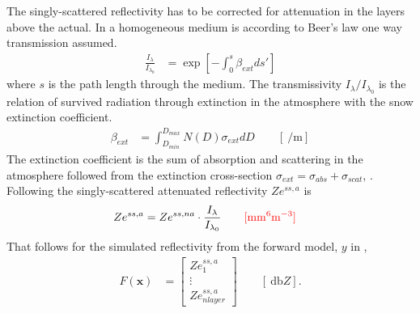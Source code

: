 The singly-scattered reflectivity has to be corrected for attenuation in the layers above the actual. In a homogeneous medium is according to Beer's law one way transmission assumed. 
\begin{align}
	\frac{I_{\lambda}}{I_{\lambda_0}} & = \exp \left[ - \int_0^s \beta_{ext} ds'\right] \label{eq:Beer}
\end{align}
where $s$ is the path length through the medium. The transmissivity $I_{\lambda}/I_{\lambda_0}$ is the relation of survived radiation through extinction in the atmosphere with the snow extinction coefficient.
\begin{align}
	\beta_{ext} & = \int_{D_{min}}^{D_{max}} N(D) \sigma_{ext} dD \qquad [\SI{}{\per\metre}] \label{eq:bext}
\end{align}
The extinction coefficient is the sum of absorption and scattering in the atmosphere followed from the extinction cross-section $\sigma_{ext} = \sigma_{abs} + \sigma_{scat}$, \citep{lohmann_introduction_2016,lamb_physics_2011}. \textcolor{red}{\cite[Eq. 12.1 and more][]{lohmann_introduction_2016}} \\
Following  the singly-scattered attenuated reflectivity $Ze^{ss, a}$ is
\begin{align}
	Ze^{ss, a} & = Ze^{ss, na} \cdot \frac{I_{\lambda}}{I_{\lambda_0}} \qquad \textcolor{red}{[\SI{}{\mm^6\metre^{-3}}]} \label{eq:sing_scatt_att_Z}
\end{align}
That follows for the simulated reflectivity from the forward model, $y$ in , 
\begin{align}
	F(\mathbf{x}) & = \begin{bmatrix} 
        	Ze^{ss,a}_1 \\
            \vdots \\
            Ze^{ss,a}_{nlayer}
        \end{bmatrix} \qquad [\SI{}{\decibel Z}].
\end{align}


